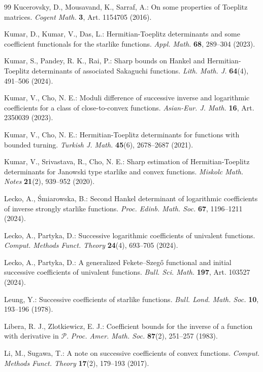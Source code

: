 \documentclass[11pt,reqno]{amsart}
\numberwithin{equation}{section}
\begin{document}
\begin{thebibliography}{99}
Kucerovsky, D., Mousavand, K., Sarraf, A.: 
On some properties of Toeplitz matrices. 
\textit{Cogent Math.} \textbf{3}, Art. 1154705 (2016).

Kumar, D., Kumar, V., Das, L.: 
Hermitian-Toeplitz determinants and some coefficient functionals for the starlike functions. 
\textit{Appl. Math.} \textbf{68}, 289--304 (2023).

Kumar, S., Pandey, R. K., Rai, P.: 
Sharp bounds on Hankel and Hermitian-Toeplitz determinants of associated Sakaguchi functions. 
\textit{Lith. Math. J.} \textbf{64}(4), 491--506 (2024).

Kumar, V., Cho, N. E.:
Moduli difference of successive inverse and logarithmic coefficients for a class of close-to-convex functions.
\textit{Asian-Eur. J. Math.} \textbf{16}, Art. 2350039 (2023).

Kumar, V., Cho, N. E.: 
Hermitian-Toeplitz determinants for functions with bounded turning. 
\textit{Turkish J. Math.} \textbf{45}(6), 2678--2687 (2021).

Kumar, V., Srivastava, R., Cho, N. E.: 
Sharp estimation of Hermitian-Toeplitz determinants for Janowski type starlike and convex functions. 
\textit{Miskolc Math. Notes} \textbf{21}(2), 939--952 (2020).

Lecko, A., \'{S}miarowska, B.:
Second Hankel determinant of logarithmic coefficients of inverse strongly starlike functions.
\textit{Proc. Edinb. Math. Soc.} \textbf{67}, 1196--1211 (2024).

Lecko, A., Partyka, D.:
Successive logarithmic coefficients of univalent functions.
\textit{Comput. Methods Funct. Theory} \textbf{24}(4), 693--705 (2024).

Lecko, A., Partyka, D.: 
A generalized Fekete--Szeg\H{o} functional and initial successive coefficients of univalent functions. 
\textit{Bull. Sci. Math.} \textbf{197}, Art. 103527 (2024).

Leung, Y.:
Successive coefficients of starlike functions.
\textit{Bull. Lond. Math. Soc.} \textbf{10}, 193--196 (1978).

Libera, R. J., Zlotkiewicz, E. J.: 
Coefficient bounds for the inverse of a function with derivative in $\mathcal{P}$. 
\textit{Proc. Amer. Math. Soc.} \textbf{87}(2), 251--257 (1983).

Li, M., Sugawa, T.:
A note on successive coefficients of convex functions.
\textit{Comput. Methods Funct. Theory} \textbf{17}(2), 179--193 (2017).


\end{thebibliography}
\end{document}
